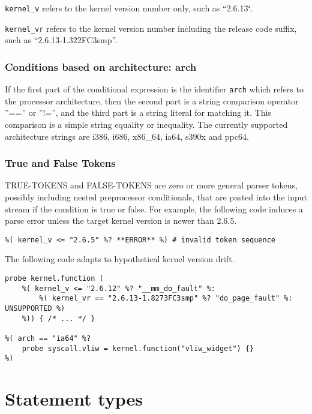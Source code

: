 \documentclass[twoside,english]{article}
\newenvironment{vindent}
{\begin{list}{}{\setlength{\listparindent}{6pt}}
\item[]}
{\end{list}}
\begin{document}
\texttt{kernel\_v} refers to the kernel version number only, such as {}``2.6.13\char`\"{}.

\texttt{kernel\_vr} refers to the kernel version number including the release
code suffix, such as {}``2.6.13-1.322FC3smp''.


\subsubsection{Conditions based on architecture: arch}
If the first part of the conditional expression is the identifier \texttt{arch}
which refers to the processor architecture, then the second part is a string
comparison operator ''=='' or ''!='', and the third part is a string
literal for matching it. This comparison is a simple string equality or inequality.
The currently supported architecture strings are i386, i686, x86\_64, ia64,
s390x and ppc64.


\subsubsection{True and False Tokens}
TRUE-TOKENS and FALSE-TOKENS are zero or more general parser tokens, possibly
including nested preprocessor conditionals, that are pasted into the input
stream if the condition is true or false. For example, the following code
induces a parse error unless the target kernel version is newer than 2.6.5.

\begin{vindent}
\begin{verbatim}
%( kernel_v <= "2.6.5" %? **ERROR** %) # invalid token sequence
\end{verbatim}
\end{vindent}
The following code adapts to hypothetical kernel version drift.

\begin{vindent}
\begin{verbatim}
probe kernel.function (
    %( kernel_v <= "2.6.12" %? "__mm_do_fault" %:
        %( kernel_vr == "2.6.13-1.8273FC3smp" %? "do_page_fault" %: UNSUPPORTED %)
    %)) { /* ... */ }

%( arch == "ia64" %?
    probe syscall.vliw = kernel.function("vliw_widget") {}
%)
\end{verbatim}
\end{vindent}

\section{Statement types\label{sec:Statement-Types}}
\end{document}
